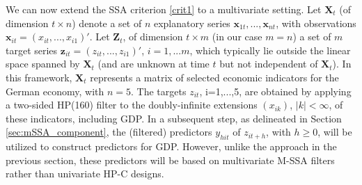 \documentclass[11pt,a4paper]{article}
\begin{document}
We can now extend the SSA criterion \ref{crit1} to a multivariate setting. Let $\mathbf{X}_t$ (of dimension $t\times n$) denote a set of $n$ explanatory series $\mathbf{x}_{1t},...,\mathbf{x}_{nt}$, with observations $\mathbf{x}_{it}=(x_{it},...,x_{i1})'$. Let $\mathbf{Z}_t$, of dimension $t\times m$ (in our case $m=n$) a set of $m$ target series $\mathbf{z}_{it}=(z_{it},...,z_{i1})'$, $i=1,...m$, which typically lie outside the linear space spanned by   $\mathbf{X}_t$ (and are unknown at time $t$ but not independent of $\mathbf{X}_t$). In this framework, $\mathbf{X}_t$ represents a matrix of selected economic indicators for the German economy, with $n=5$. The targets $z_{it}$, i=1,...,5,   are obtained by applying a two-sided HP(160) filter to the doubly-infinite extensions $(x_{ik})$, $|k|<\infty$, of these indicators, including GDP. In a subsequent step, as delineated in Section \ref{sec:mSSA_component}, the (filtered) predictors $y_{hit}$ of $z_{it+h}$, with $h\geq 0$,  will be utilized to construct predictors for GDP. However, unlike the approach in the previous section, these predictors will be based on multivariate M-SSA filters rather than univariate HP-C designs. %
\end{document}
